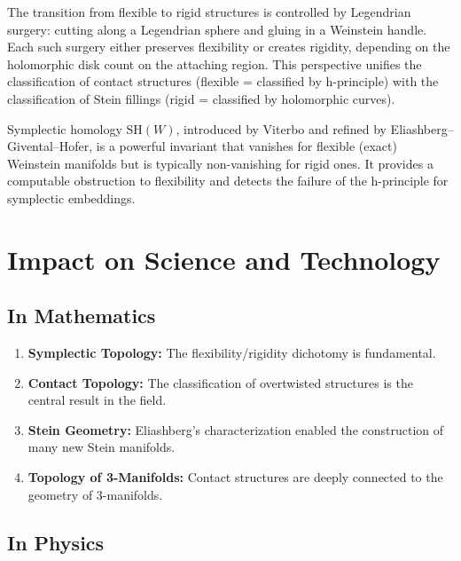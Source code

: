 \begin{remark}
The transition from flexible to rigid structures is controlled by Legendrian surgery: cutting along a Legendrian sphere and gluing in a Weinstein handle. Each such surgery either preserves flexibility or creates rigidity, depending on the holomorphic disk count on the attaching region. This perspective unifies the classification of contact structures (flexible = classified by h-principle) with the classification of Stein fillings (rigid = classified by holomorphic curves).
\end{remark}

\begin{remark}
Symplectic homology $\mathrm{SH}(W)$, introduced by Viterbo and refined by Eliashberg--Givental--Hofer, is a powerful invariant that vanishes for flexible (exact) Weinstein manifolds but is typically non-vanishing for rigid ones. It provides a computable obstruction to flexibility and detects the failure of the h-principle for symplectic embeddings.
\end{remark}

\section{Impact on Science and Technology}

\subsection{In Mathematics}

\begin{enumerate}
    \item \textbf{Symplectic Topology:} The flexibility/rigidity dichotomy is fundamental.
    \item \textbf{Contact Topology:} The classification of overtwisted structures is the central result in the field.
    \item \textbf{Stein Geometry:} Eliashberg's characterization enabled the construction of many new Stein manifolds.
    \item \textbf{Topology of 3-Manifolds:} Contact structures are deeply connected to the geometry of 3-manifolds.
\end{enumerate}

\subsection{In Physics}


